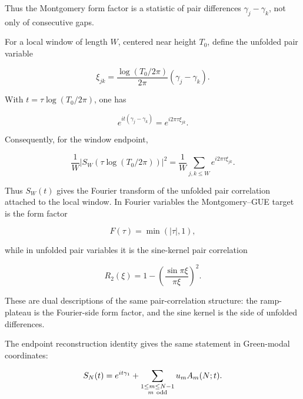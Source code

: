 \documentclass[11pt]{amsart}
\numberwithin{equation}{section}
\theoremstyle{plain}
\theoremstyle{definition}
\theoremstyle{remark}
\begin{document}
Thus the Montgomery form factor is a statistic of pair differences
\(\gamma_j-\gamma_k\), not only of consecutive gaps.

For a local window of length \(W\), centered near height \(T_0\), define
the unfolded pair variable

\begin{equation}
\xi_{jk}
=
\frac{\log(T_0/2\pi)}{2\pi}
(\gamma_j-\gamma_k).
\label{eq:unfolded_pair_variable_xi_jk}
\end{equation}

With \(t=\tau\log(T_0/2\pi)\), one has

\begin{equation}
e^{it(\gamma_j-\gamma_k)}
=
e^{i2\pi\tau\xi_{jk}}.
\label{eq:deformed_phase_as_unfolded_pair_fourier_phase}
\end{equation}

Consequently, for the window endpoint,

\begin{equation}
\frac1W
\left|
S_W(\tau\log(T_0/2\pi))
\right|^2
=
\frac1W
\sum_{j,k\le W}
e^{i2\pi\tau\xi_{jk}}.
\label{eq:window_endpoint_fourier_pair_correlation}
\end{equation}

Thus \(S_W(t)\) gives the Fourier transform of the unfolded pair
correlation attached to the local window. In Fourier variables the
Montgomery--GUE target is the form factor

\begin{equation}
F(\tau)=\min(|\tau|,1),
\label{eq:montgomery_gue_form_factor_target_deformed_walk}
\end{equation}

while in unfolded pair variables it is the sine-kernel pair correlation

\begin{equation}
R_2(\xi)
=
1-
\left(
\frac{\sin \pi\xi}{\pi\xi}
\right)^2.
\label{eq:sine_kernel_pair_correlation_target_deformed_walk}
\end{equation}

These are dual descriptions of the same pair-correlation structure: the
ramp-plateau is the Fourier-side form factor, and the sine kernel is the
side of unfolded differences.

The endpoint reconstruction identity gives the same statement in
Green-modal coordinates:

\begin{equation}
S_N(t)
=
e^{it\gamma_1}
+
\sum_{\substack{1\le m\le N-1\\ m\ {\rm odd}}}
u_m A_m(N;t).
\label{eq:deformed_endpoint_green_modal_reconstruction}
\end{equation}
\end{document}
